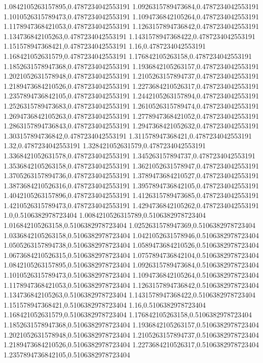 1.0842105263157895,0.4787234042553191
1.0926315789473684,0.4787234042553191
1.1010526315789473,0.4787234042553191
1.1094736842105264,0.4787234042553191
1.1178947368421053,0.4787234042553191
1.1263157894736842,0.4787234042553191
1.134736842105263,0.4787234042553191
1.1431578947368422,0.4787234042553191
1.151578947368421,0.4787234042553191
1.16,0.4787234042553191
1.168421052631579,0.4787234042553191
1.176842105263158,0.4787234042553191
1.1852631578947368,0.4787234042553191
1.1936842105263157,0.4787234042553191
1.2021052631578948,0.4787234042553191
1.2105263157894737,0.4787234042553191
1.2189473684210526,0.4787234042553191
1.2273684210526317,0.4787234042553191
1.2357894736842105,0.4787234042553191
1.2442105263157894,0.4787234042553191
1.2526315789473683,0.4787234042553191
1.2610526315789474,0.4787234042553191
1.2694736842105263,0.4787234042553191
1.2778947368421052,0.4787234042553191
1.2863157894736843,0.4787234042553191
1.2947368421052632,0.4787234042553191
1.303157894736842,0.4787234042553191
1.311578947368421,0.4787234042553191
1.32,0.4787234042553191
1.328421052631579,0.4787234042553191
1.3368421052631578,0.4787234042553191
1.345263157894737,0.4787234042553191
1.3536842105263158,0.4787234042553191
1.3621052631578947,0.4787234042553191
1.3705263157894736,0.4787234042553191
1.3789473684210527,0.4787234042553191
1.3873684210526316,0.4787234042553191
1.3957894736842105,0.4787234042553191
1.4042105263157896,0.4787234042553191
1.4126315789473685,0.4787234042553191
1.4210526315789473,0.4787234042553191
1.4294736842105262,0.4787234042553191
1.0,0.5106382978723404
1.0084210526315789,0.5106382978723404
1.016842105263158,0.5106382978723404
1.0252631578947369,0.5106382978723404
1.0336842105263158,0.5106382978723404
1.0421052631578946,0.5106382978723404
1.0505263157894738,0.5106382978723404
1.0589473684210526,0.5106382978723404
1.0673684210526315,0.5106382978723404
1.0757894736842104,0.5106382978723404
1.0842105263157895,0.5106382978723404
1.0926315789473684,0.5106382978723404
1.1010526315789473,0.5106382978723404
1.1094736842105264,0.5106382978723404
1.1178947368421053,0.5106382978723404
1.1263157894736842,0.5106382978723404
1.134736842105263,0.5106382978723404
1.1431578947368422,0.5106382978723404
1.151578947368421,0.5106382978723404
1.16,0.5106382978723404
1.168421052631579,0.5106382978723404
1.176842105263158,0.5106382978723404
1.1852631578947368,0.5106382978723404
1.1936842105263157,0.5106382978723404
1.2021052631578948,0.5106382978723404
1.2105263157894737,0.5106382978723404
1.2189473684210526,0.5106382978723404
1.2273684210526317,0.5106382978723404
1.2357894736842105,0.5106382978723404
